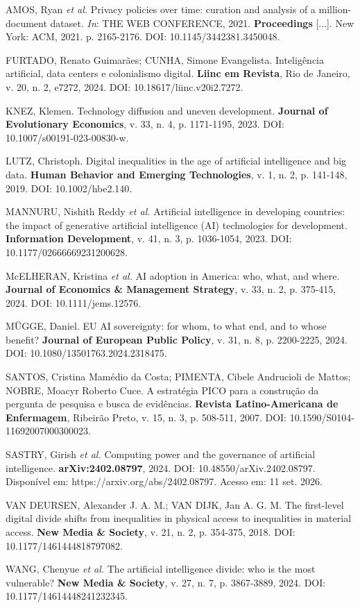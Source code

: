 \documentclass[12pt,a4paper]{article}
\begin{document}
AMOS, Ryan \textit{et al.} Privacy policies over time: curation and analysis of a million-document dataset. \textit{In}: THE WEB CONFERENCE, 2021. \textbf{Proceedings} [...]. New York: ACM, 2021. p. 2165-2176. DOI: 10.1145/3442381.3450048.

FURTADO, Renato Guimarães; CUNHA, Simone Evangelista. Inteligência artificial, data centers e colonialismo digital. \textbf{Liinc em Revista}, Rio de Janeiro, v. 20, n. 2, e7272, 2024. DOI: 10.18617/liinc.v20i2.7272.

KNEZ, Klemen. Technology diffusion and uneven development. \textbf{Journal of Evolutionary Economics}, v. 33, n. 4, p. 1171-1195, 2023. DOI: 10.1007/s00191-023-00830-w.

LUTZ, Christoph. Digital inequalities in the age of artificial intelligence and big data. \textbf{Human Behavior and Emerging Technologies}, v. 1, n. 2, p. 141-148, 2019. DOI: 10.1002/hbe2.140.

MANNURU, Nishith Reddy \textit{et al.} Artificial intelligence in developing countries: the impact of generative artificial intelligence (AI) technologies for development. \textbf{Information Development}, v. 41, n. 3, p. 1036-1054, 2023. DOI: 10.1177/02666669231200628.

McELHERAN, Kristina \textit{et al.} AI adoption in America: who, what, and where. \textbf{Journal of Economics \& Management Strategy}, v. 33, n. 2, p. 375-415, 2024. DOI: 10.1111/jems.12576.

MÜGGE, Daniel. EU AI sovereignty: for whom, to what end, and to whose benefit? \textbf{Journal of European Public Policy}, v. 31, n. 8, p. 2200-2225, 2024. DOI: 10.1080/13501763.2024.2318475.

SANTOS, Cristina Mamédio da Costa; PIMENTA, Cibele Andrucioli de Mattos; NOBRE, Moacyr Roberto Cuce. A estratégia PICO para a construção da pergunta de pesquisa e busca de evidências. \textbf{Revista Latino-Americana de Enfermagem}, Ribeirão Preto, v. 15, n. 3, p. 508-511, 2007. DOI: 10.1590/S0104-11692007000300023.

SASTRY, Girish \textit{et al.} Computing power and the governance of artificial intelligence. \textbf{arXiv:2402.08797}, 2024. DOI: 10.48550/arXiv.2402.08797. Disponível em: https://arxiv.org/abs/2402.08797. Acesso em: 11 set. 2026.

VAN DEURSEN, Alexander J. A. M.; VAN DIJK, Jan A. G. M. The first-level digital divide shifts from inequalities in physical access to inequalities in material access. \textbf{New Media \& Society}, v. 21, n. 2, p. 354-375, 2018. DOI: 10.1177/1461444818797082.

WANG, Chenyue \textit{et al.} The artificial intelligence divide: who is the most vulnerable? \textbf{New Media \& Society}, v. 27, n. 7, p. 3867-3889, 2024. DOI: 10.1177/14614448241232345.

\endgroup
\end{document}
